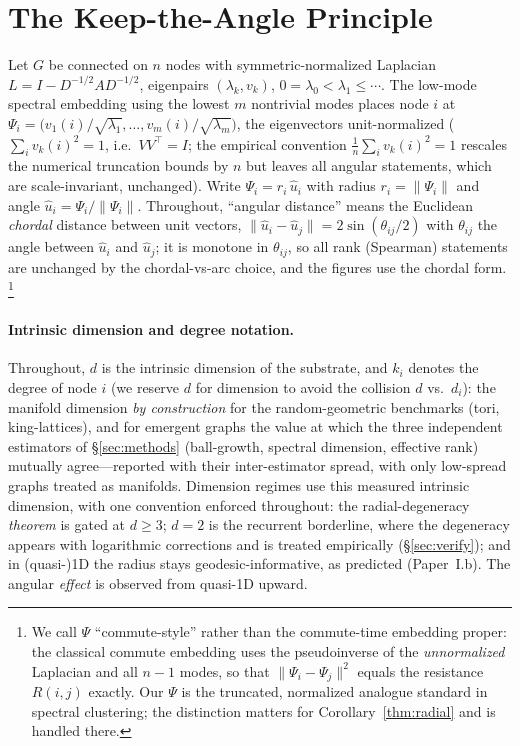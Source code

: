 \documentclass[review]{siamart220329}
\begin{document}
\section{The Keep-the-Angle Principle}\label{sec:thm}
Let $G$ be connected on $n$ nodes with symmetric-normalized Laplacian
$L = I - D^{-1/2} A D^{-1/2}$, eigenpairs $(\lambda_k, v_k)$,
$0=\lambda_0<\lambda_1\le\cdots$. The low-mode spectral embedding using the
lowest $m$ nontrivial modes places node $i$ at
$\Psi_i = \big(v_1(i)/\sqrt{\lambda_1},\dots,v_m(i)/\sqrt{\lambda_m}\big)$, the
eigenvectors unit-normalized ($\sum_i v_k(i)^2=1$, i.e.\ $VV^\top=I$; the empirical
convention $\tfrac1n\sum_i v_k(i)^2=1$ rescales the numerical truncation bounds by
$n$ but leaves all angular statements, which are scale-invariant, unchanged).
Write $\Psi_i = r_i\,\hat u_i$ with radius $r_i=\lVert\Psi_i\rVert$ and angle
$\hat u_i = \Psi_i/\lVert\Psi_i\rVert$. Throughout, ``angular distance''
means the Euclidean \emph{chordal} distance between unit vectors,
$\lVert\hat u_i-\hat u_j\rVert=2\sin(\theta_{ij}/2)$ with $\theta_{ij}$ the
angle between $\hat u_i$ and $\hat u_j$; it is monotone in $\theta_{ij}$, so all
rank (Spearman) statements are unchanged by the chordal-vs-arc choice, and the
figures use the chordal form.
\footnote{We call $\Psi$ ``commute-style'' rather than the commute-time
embedding proper: the classical commute embedding uses the pseudoinverse of the
\emph{unnormalized} Laplacian and all $n-1$ modes, so that
$\lVert\Psi_i-\Psi_j\rVert^2$ equals the resistance $R(i,j)$ exactly. Our
$\Psi$ is the truncated, normalized analogue standard in spectral clustering;
the distinction matters for Corollary~\ref{thm:radial} and is handled there.}

\paragraph{Intrinsic dimension and degree notation.} Throughout, $d$ is the
intrinsic dimension of the substrate, and $k_i$ denotes the degree of node
$i$ (we reserve $d$ for dimension to avoid the collision $d$ vs.\ $d_i$): the
manifold dimension \emph{by construction} for the random-geometric benchmarks
(tori, king-lattices), and for emergent graphs the value at which the
three independent estimators of \S\ref{sec:methods} (ball-growth, spectral
dimension, effective rank) mutually agree---reported with their inter-estimator
spread, with only low-spread graphs treated as manifolds. Dimension regimes
use this measured intrinsic dimension, with one convention enforced throughout:
the radial-degeneracy \emph{theorem} is gated at $d\ge3$; $d=2$ is the recurrent
borderline, where the degeneracy appears with logarithmic corrections and is
treated empirically (\S\ref{sec:verify}); and in (quasi-)1D the radius stays
geodesic-informative, as predicted (Paper~I.b). The angular \emph{effect}
is observed from quasi-1D upward.
\end{document}
